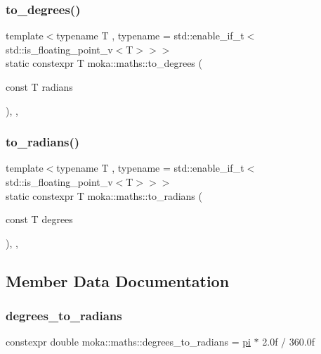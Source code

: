 \subsubsection{\texorpdfstring{to\_degrees()}{to\_degrees()}}
{\footnotesize\ttfamily template$<$typename T , typename  = std\+::enable\+\_\+if\+\_\+t$<$std\+::is\+\_\+floating\+\_\+point\+\_\+v$<$\+T$>$$>$$>$ \\
static constexpr T moka\+::maths\+::to\+\_\+degrees (\begin{DoxyParamCaption}\item[{const T}]{radians }\end{DoxyParamCaption})\hspace{0.3cm}{\ttfamily [inline]}, {\ttfamily [static]}, {\ttfamily [noexcept]}}

\mbox{\label{classmoka_1_1maths_a1aa2a629f86e0989fef0d73e23deab3e}} 
\subsubsection{\texorpdfstring{to\_radians()}{to\_radians()}}
{\footnotesize\ttfamily template$<$typename T , typename  = std\+::enable\+\_\+if\+\_\+t$<$std\+::is\+\_\+floating\+\_\+point\+\_\+v$<$\+T$>$$>$$>$ \\
static constexpr T moka\+::maths\+::to\+\_\+radians (\begin{DoxyParamCaption}\item[{const T}]{degrees }\end{DoxyParamCaption})\hspace{0.3cm}{\ttfamily [inline]}, {\ttfamily [static]}, {\ttfamily [noexcept]}}



\subsection{Member Data Documentation}
\mbox{\label{classmoka_1_1maths_ac1bea7ec8a939b579e3ccefa4c2a2e38}} 
\subsubsection{\texorpdfstring{degrees\_to\_radians}{degrees\_to\_radians}}
{\footnotesize\ttfamily constexpr double moka\+::maths\+::degrees\+\_\+to\+\_\+radians = \mbox{\hyperlink{classmoka_1_1maths_a6ef4ef43afc0c5179f724bacbda196b4}{pi}} $\ast$ 2.\+0f / 360.\+0f\hspace{0.3cm}{\ttfamily [static]}}

